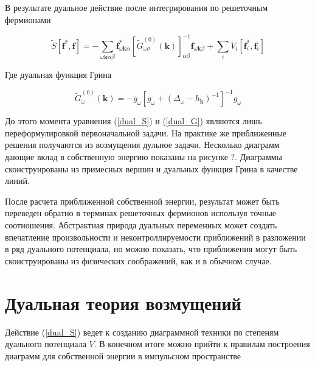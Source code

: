 \documentclass[11pt,a4paper]{report}
\begin{document}
В результате дуальное действие после интегрирования по решеточным фермионами

\begin{equation}
 \label{dual_S}
 \tilde{S}[\mathbf{f}^*,\mathbf{f}] = -\sum_{\omega\mathbf{k}\alpha\beta}\mathbf{f}^*_{\omega\mathbf{k}\alpha}[\tilde{G}^{(0)}_{\omega\sigma}(\mathbf{k})]_{\alpha\beta}^{-1}\mathbf{f}_{\omega\mathbf{k}\beta}+\sum_i V_i[\mathbf{f}^*_i,\mathbf{f}_i]
\end{equation}

Где дуальная функция Грина

\begin{equation}
 \label{dual_G}
 \tilde{G}^{(0)}_\omega(\mathbf{k}) = -g_\omega\left[g_\omega+(\Delta_\omega-h_\mathbf{k})^{-1}\right]^{-1} g_\omega
\end{equation}

До этого момента уравнения (\ref{dual_S}) и (\ref{dual_G}) являются лишь переформулировкой первоначальной задачи. На практике же приближенные решения получаются из возмущения дульное задачи.
Несколько диаграмм дающие вклад в собственную энергию показаны на рисунке ?. Диаграммы сконструированы из примесных вершин и дуальных функция Грина в качестве линий.

После расчета приближенной собственной энергии, результат может быть переведен обратно в терминах решеточных фермионов используя точные соотношения. 
Абстрактная природа дуальных переменных может создать впечатление произвольности и неконтроллируемости приближений в разложении в ряд дуального потенциала, 
 но можно показать, что приближения могут быть сконструированы из физических соображений, как и в обычном случае.

\section{Дуальная теория возмущений}

Действие (\ref{dual_S}) ведет к созданию диаграммной техники по степеням дуального потенциала $V$. В конечном итоге можно прийти к правилам построения диаграмм для собственной энергии в импульсном пространстве
 
\end{document}
